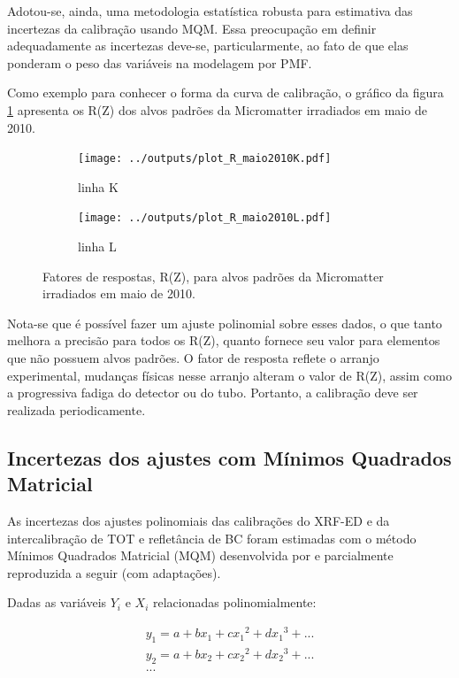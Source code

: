 Adotou-se, ainda, uma metodologia estatística robusta para estimativa das 
incertezas da calibração usando MQM. Essa preocupação em definir 
adequadamente as incertezas deve-se, particularmente, ao fato de que elas 
ponderam o peso das variáveis na modelagem por PMF.

Como exemplo para conhecer o forma da curva de calibração, o gráfico da figura 
\ref{fg:edxrfcalib} apresenta os R(Z) dos alvos padrões da Micromatter 
irradiados em maio de 2010. 

\begin{figure}[H]
  \begin{subfigure}[b]{0.45\textwidth}
    \texttt{[image: ../outputs/plot\_R\_maio2010K.pdf]}
    \caption{linha K}
  \end{subfigure}%
  \begin{subfigure}[b]{0.45\textwidth}
    \texttt{[image: ../outputs/plot\_R\_maio2010L.pdf]}
    \caption{linha L}
  \end{subfigure}
  \caption{Fatores de respostas, R(Z), para alvos padrões da 
           Micromatter irradiados em maio de 2010. 
           \label{fg:edxrfcalib}}
\end{figure}

Nota-se que é possível fazer um ajuste polinomial sobre esses dados, 
o que tanto melhora a precisão para todos os R(Z), quanto fornece seu valor
para elementos que não possuem alvos padrões. O fator de resposta reflete 
o arranjo experimental, mudanças físicas
nesse arranjo alteram o valor de R(Z), assim como a progressiva fadiga do detector
ou do tubo. Portanto, a calibração deve ser realizada periodicamente.

\subsection{Incertezas dos ajustes com Mínimos Quadrados Matricial}

As incertezas dos ajustes polinomiais das calibrações do XRF-ED e da 
intercalibração de TOT e refletância de BC foram estimadas com o método 
Mínimos Quadrados Matricial (MQM) desenvolvida por \citet{helene2006}
e parcialmente reproduzida a seguir (com adaptações).

Dadas as variáveis $Y_i$ e $X_i$ relacionadas polinomialmente:

\begin{equation}
  \label{eq:polinomio}
  \begin{split}
    y_1 = a + b x_1 + c{x_1}^2 + d{x_1}^3 + ...\\
    y_2 = a + b x_2 + c{x_2}^2 + d{x_2}^3 + ... \\
    ...
  \end{split}
\end{equation}

